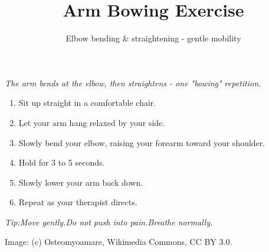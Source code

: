 \documentclass[20pt]{beamer}
\title{Arm Bowing Exercise}
\subtitle{Elbow bending \& straightening - gentle mobility}
\author{}
\date{}
\begin{document}
\begin{frame}
\centering
{}
\vspace{0.6em}
{\large\textit{The arm bends at the elbow, then straightens - one "bowing" repetition.}}
\end{frame}

\begin{frame}
\vspace{0.4em}

{\normalsize
\begin{enumerate}[leftmargin=2.2em,itemsep=0.45em,topsep=0.2em,label=\bfseries\arabic*.]
  \item Sit up straight in a comfortable chair.
  \item Let your arm hang relaxed by your side.
  \item Slowly bend your elbow, raising your forearm toward your shoulder.
  \item Hold for 3 to 5 seconds.
  \item Slowly lower your arm back down.
  \item Repeat as your therapist directs.
\end{enumerate}
}

\vspace{0.5em}
{\normalsize\emph{Tip:\quad Move gently.\quad Do not push into pain.\quad Breathe normally.}}

\vspace{0.5em}
{\footnotesize Image: (c) Osteomyoamare, Wikimedia Commons, CC BY 3.0.}
\end{frame}
\end{document}
